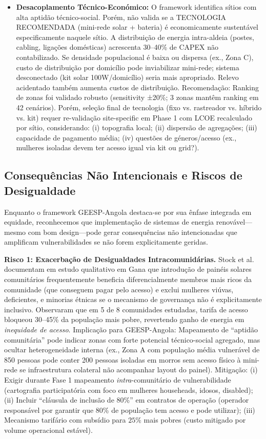 \documentclass[12pt, a4paper]{article}
\begin{document}
{{{{{{{{{{{{\begin{itemize}
\item \textbf{Desacoplamento Técnico-Económico:} O framework identifica sítios com alta aptidão técnico-social. Porém, não valida se a TECNOLOGIA RECOMENDADA (mini-rede solar + bateria) é economicamente sustentável especificamente naquele sítio. A distribuição de energia intra-aldeia (postes, cabling, ligações domésticas) acrescenta 30--40\% de CAPEX não contabilizado. Se densidade populacional é baixa ou dispersa (ex., Zona C), custo de distribuição por domicílio pode inviabilizar mini-rede; sistema desconectado (kit solar 100W/domicílio) seria mais apropriado. Relevo acidentado também aumenta custos de distribuição. Recomendação: Ranking de zonas foi validado robusto (sensitivity ±20\%; 3 zonas mantêm ranking em 42 cenários). Porém, seleção final de tecnologia (fixo vs. rastreador vs. híbrido vs. kit) requer re-validação site-specific em Phase 1 com LCOE recalculado por sítio, considerando: (i) topografia local; (ii) dispersão de agregações; (iii) capacidade de pagamento média; (iv) questões de géneros/acesso (ex., mulheres isoladas devem ter acesso igual via kit ou grid?).

\end{itemize}

\subsection{Consequências Não Intencionais e Riscos de Desigualdade}

Enquanto o framework GEESP-Angola destaca-se por sua ênfase integrada em equidade, reconhecemos que implementação de sistemas de energia renovável—mesmo com bom design—pode gerar consequências não intencionadas que amplificam vulnerabilidades se não forem explicitamente geridas.

\textbf{Risco 1: Exacerbação de Desigualdades Intracomunidárias.} Stock et al.~\citep{Stock2023} documentam em estudo qualitativo em Gana que introdução de painéis solares comunitários frequentemente beneficia diferencialmente membros mais ricos da comunidade (que conseguem pagar pelo acesso) e exclui mulheres viúvas, deficientes, e minorias étnicas se o mecanismo de governança não é explicitamente inclusivo. Observaram que em 5 de 8 comunidades estudadas, tarifa de acesso bloqueou 30--45\% da população mais pobre, revertendo ganho de energia em \textit{inequidade de acesso}. Implicação para GEESP-Angola: Mapeamento de ``aptidão comunitária'' pode indicar zonas com forte potencial técnico-social agregado, mas ocultar heterogeneidade interna (ex., Zona A com população média vulnerável de 850 pessoas pode conter 200 pessoas isoladas em morros sem acesso físico à mini-rede se infraestrutura colateral não acompanhar layout do painel). Mitigação: (i) Exigir durante Fase 1 mapeamento \textit{intra}-comunitário de vulnerabilidade (cartografia participatória com foco em mulheres househeads, idosos, disabled); (ii) Incluir ``cláusula de inclusão de 80\%'' em contratos de operação (operador responsável por garantir que 80\% de população tem acesso e pode utilizar);  (iii) Mecanismo tarifário com subsídio para $25\%$ mais pobres (custo mitigado por volume operacional estável).

}}}}}}}}}}}}
\end{document}
